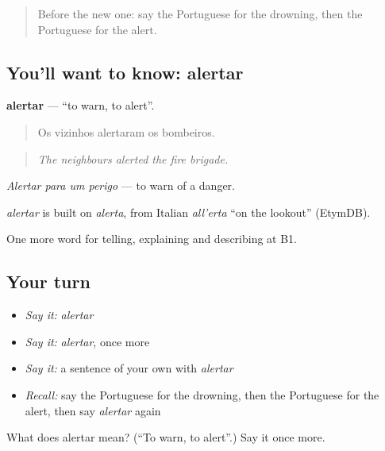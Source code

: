 \label{lesson:PT-C303-alertar}



\begin{quote}
Before the new one: say the Portuguese for the drowning, then the Portuguese for the alert.
\end{quote}

\subsection*{You'll want to know: alertar}
\textbf{alertar} — \textquotedblleft{}to warn, to alert\textquotedblright{}.

\begin{quote}
Os vizinhos alertaram os bombeiros.
\end{quote}

\begin{quote}
\emph{The neighbours alerted the fire brigade.}
\end{quote}

\emph{Alertar para um perigo} — to warn of a danger.

\begin{cousinweb}
\emph{alertar} is built on \emph{alerta}, from Italian \emph{all’erta} \textquotedblleft{}on the lookout\textquotedblright{} (EtymDB).
\end{cousinweb}

\begin{grammarlens}[title={What you've built}]
One more word for telling, explaining and describing at B1.
\end{grammarlens}

\subsection*{Your turn}
\begin{itemize}
\raggedright
  \item \emph{Say it:} \emph{alertar}
  \item \emph{Say it:} \emph{alertar}, once more
  \item \emph{Say it:} a sentence of your own with \emph{alertar}
  \item \emph{Recall:} say the Portuguese for the drowning, then the Portuguese for the alert, then say \emph{alertar} again
\end{itemize}

\begin{tcolorbox}[breakable,colback=teal!4,colframe=teal!35!black,title={Before you move on}]
What does alertar mean? (\textquotedblleft{}To warn, to alert\textquotedblright{}.) Say it once more.
\end{tcolorbox}
